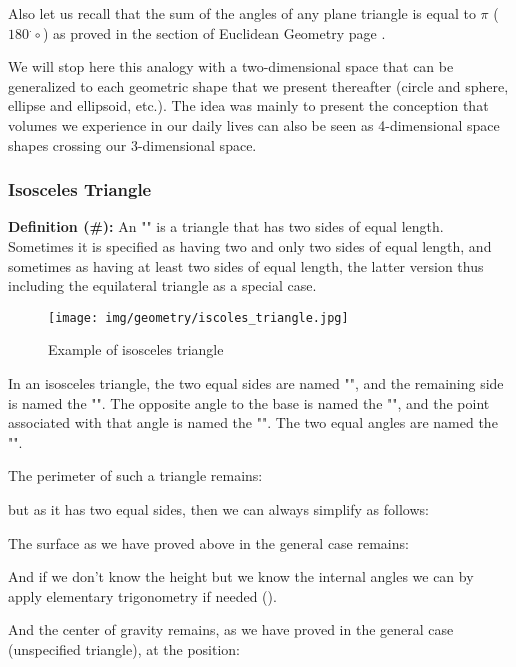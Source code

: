 {	Also let us recall that the sum of the angles of any plane triangle is equal to $\pi$ ($180^.\circ$) as proved in the section of Euclidean Geometry page \pageref{angle sum theorem}.
	
	We will stop here this analogy with a two-dimensional space that can be generalized to each geometric shape that we present thereafter (circle and sphere, ellipse and ellipsoid, etc.). The idea was mainly to present the conception that volumes we experience in our daily lives can also be seen as 4-dimensional space shapes crossing our 3-dimensional space.
	
	\subsubsection{Isosceles Triangle}
	\textbf{Definition (\#\mydef):} An "" is a triangle that has two sides of equal length. Sometimes it is specified as having two and only two sides of equal length, and sometimes as having at least two sides of equal length, the latter version thus including the equilateral triangle as a special case.
	
	\begin{figure}[H]
		\centering
		\texttt{[image: img/geometry/iscoles\_triangle.jpg]}
		\caption{Example of isosceles triangle}
	\end{figure}
	In an isosceles triangle, the two equal sides are named "", and the remaining side is named the "". The opposite angle to the base is named the "", and the point associated with that angle is named the "". The two equal angles are named the "".
	
	The perimeter of such a triangle remains:
	
	but as it has two equal sides, then we can always simplify as follows:
	
	The surface as we have proved above in the general case remains:
	
	And if we don't know the height but we know the internal angles we can by apply elementary trigonometry if needed ().
	
	And the center of gravity remains, as we have proved in the general case (unspecified triangle), at the position:
	
}
